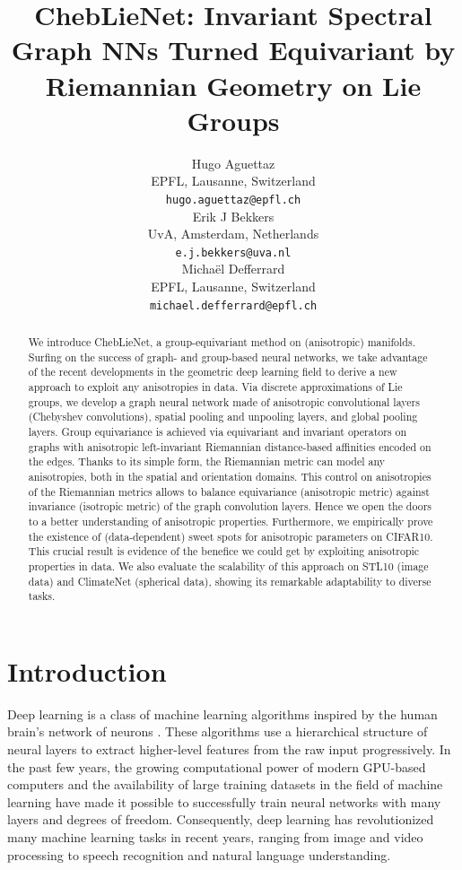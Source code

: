 \documentclass{article}
\title{ChebLieNet: Invariant Spectral Graph NNs Turned Equivariant by Riemannian Geometry on Lie Groups}
\author{%
  Hugo Aguettaz \\
  EPFL, Lausanne, Switzerland \\
  \texttt{hugo.aguettaz@epfl.ch} \\
  \AND
  Erik J Bekkers \\
  UvA, Amsterdam, Netherlands \\
  \texttt{e.j.bekkers@uva.nl} \\
  \And
  Michaël Defferrard \\
  EPFL, Lausanne, Switzerland \\
  \texttt{michael.defferrard@epfl.ch} \\
}
\begin{document}
\maketitle

\begin{abstract}
    We introduce ChebLieNet, a group-equivariant method on (anisotropic) manifolds. Surfing on the success of graph- and group-based neural networks, we take advantage of the recent developments in the geometric deep learning field to derive a new approach to exploit any anisotropies in data. Via discrete approximations of Lie groups, we develop a graph neural network made of anisotropic convolutional layers (Chebyshev convolutions), spatial pooling and unpooling layers, and global pooling layers. Group equivariance is achieved via equivariant and invariant operators on graphs with anisotropic left-invariant Riemannian distance-based affinities encoded on the edges. Thanks to its simple form, the Riemannian metric can model any anisotropies, both in the spatial and orientation domains. This control on anisotropies of the Riemannian metrics allows to balance equivariance (anisotropic metric) against invariance (isotropic metric) of the graph convolution layers. Hence we open the doors to a better understanding of anisotropic properties. Furthermore, we empirically prove the existence of (data-dependent) sweet spots for anisotropic parameters on CIFAR10. This crucial result is evidence of the benefice we could get by exploiting anisotropic properties in data. We also evaluate the scalability of this approach on STL10 (image data) and ClimateNet (spherical data), showing its remarkable adaptability to diverse tasks.
\end{abstract}

\section{Introduction} \label{sec:introduction}

Deep learning is a class of machine learning algorithms inspired by the human brain's network of neurons \citep{goodfellow2016deep}. These algorithms use a hierarchical structure of neural layers to extract higher-level features from the raw input progressively. In the past few years, the growing computational power of modern GPU-based computers and the availability of large training datasets in the field of machine learning have made it possible to successfully train neural networks with many layers and degrees of freedom. Consequently, deep learning has revolutionized many machine learning tasks in recent years, ranging from image and video processing to speech recognition and natural language understanding.
\end{document}
